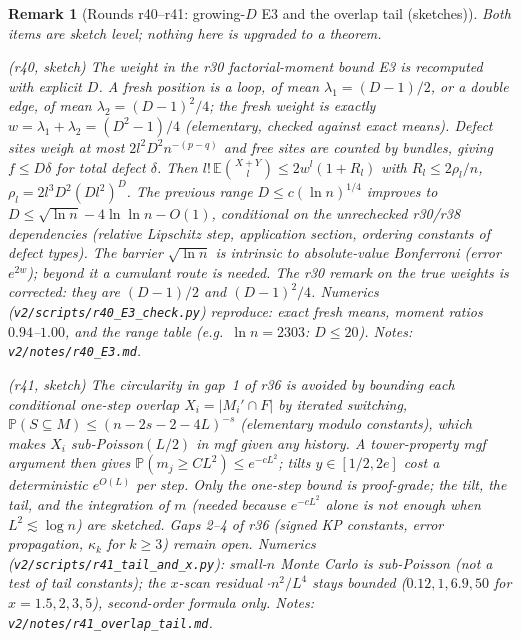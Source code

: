 \documentclass[11pt]{article}
\newtheorem{remark}[theorem]{Remark}
\newcommand{\EE}{\mathbb{E}}
\newcommand{\PP}{\mathbb{P}}
\begin{document}
\begin{remark}[{Rounds r40--r41: growing-\(D\) E3 and the overlap tail (sketches)}]
\label{rem:rounds-r40-r41}
Both items are \emph{sketch level}; nothing here is upgraded to a theorem.

(r40, sketch) The weight in the r30 factorial-moment bound E3 is recomputed with
explicit \(D\). A fresh position is a loop, of mean \(\lambda_1=(D-1)/2\), or a double
edge, of mean \(\lambda_2=(D-1)^2/4\); the fresh weight is exactly
\(w=\lambda_1+\lambda_2=(D^2-1)/4\) (elementary, checked against exact means).
Defect sites weigh at most \(2l^2D^2n^{-(p-q)}\) and free sites are counted by bundles,
giving \(f\le D\delta\) for total defect \(\delta\). Then
\(l!\,\EE\binom{X+Y}{l}\le 2w^l(1+R_l)\) with \(R_l\le 2\rho_l/n\),
\(\rho_l=2l^3D^2(Dl^2)^D\). The previous range \(D\le c(\ln n)^{1/4}\) improves to
\(D\le\sqrt{\ln n}-4\ln\ln n-O(1)\), conditional on the unrechecked r30/r38
dependencies (relative Lipschitz step, application section, ordering constants of
defect types). The barrier \(\sqrt{\ln n}\) is intrinsic to absolute-value
Bonferroni (error \(e^{2w}\)); beyond it a cumulant route is needed. The r30 remark on
the true weights is corrected: they are \((D-1)/2\) and \((D-1)^2/4\).
Numerics (\texttt{v2/scripts/r40\_E3\_check.py}) reproduce: exact fresh means, moment
ratios \(0.94\)--\(1.00\), and the range table (e.g.\ \(\ln n=2303\): \(D\le20\)).
Notes: \texttt{v2/notes/r40\_E3.md}.

(r41, sketch) The circularity in gap~1 of r36 is avoided by bounding each conditional
one-step overlap \(X_i=|M_i'\cap F|\) by iterated switching,
\(\PP(S\subseteq M)\le(n-2s-2-4L)^{-s}\) (elementary modulo constants), which makes
\(X_i\) sub-Poisson\((L/2)\) in mgf given any history. A tower-property mgf argument
then gives \(\PP(m_j\ge CL^2)\le e^{-cL^2}\); tilts \(y\in[1/2,2e]\) cost a
deterministic \(e^{O(L)}\) per step. Only the one-step bound is proof-grade; the tilt,
the tail, and the integration of \(m\) (needed because \(e^{-cL^2}\) alone is not enough when
\(L^2\lesssim\log n\)) are sketched. Gaps 2--4 of r36 (signed KP constants, error
propagation, \(\kappa_k\) for \(k\ge3\)) remain open. Numerics
(\texttt{v2/scripts/r41\_tail\_and\_x.py}): small-\(n\) Monte Carlo is sub-Poisson
(not a test of tail constants); the \(x\)-scan residual \(\cdot n^2/L^4\) stays bounded
(\(0.12,1,6.9,50\) for \(x=1.5,2,3,5\)), second-order formula only.
Notes: \texttt{v2/notes/r41\_overlap\_tail.md}.
\end{remark}
\end{document}
